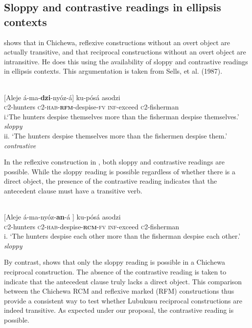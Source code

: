 \documentclass[output=paper]{langsci/langscibook}
\begin{document}
\subsection{Sloppy and contrastive readings in ellipsis contexts}

  \citet[106]{Mchombo2004} shows that in Chichewa, reflexive constructions without an overt object are actually transitive, and that reciprocal constructions without an overt object are intransitive. He does this using the availability of sloppy and contrastive readings in ellipsis contexts. This argumentation is taken from Sells, et al. (1987).



\ea\label{ex:}
\\
{}[Aleje    á-ma-\textbf{{dzi}}{-nyóz-á}] ku-pósá   asodzi \\
  \textsc{c}2-hunters   \textsc{c2-hab-}\textbf{\textsc{rfm}}-despise-\textsc{fv}   \textsc{inf}-exceed   \textsc{c}2-fisherman\\
\glt i.‘The hunters despise themselves more than the fisherman despise themselves.’ \textit{sloppy} \\
\glt ii. ‘The hunters despise themselves more than the fishermen despise them.’    \textit{contrastive}
\z


In the reflexive construction in , both sloppy and contrastive readings are possible. While the sloppy reading is possible regardless of whether there is a direct object, the presence of the contrastive reading indicates that the antecedent clause must have a transitive verb. 


\ea\label{ex:}
  \\
\gll {}[Aleje     á-ma-nyóz-\textbf{an}-á   ]    ku-pósá   asodzi \\
\textsc{c}2-hunters   \textsc{c2-hab}-despise-\textbf{\textsc{rcm}}\textsc{-fv}     \textsc{inf}-exceed   \textsc{c}2-fisherman \\
\glt
i. ‘The hunters despise each other more than the fisherman despise each other.'  \textit{sloppy}  
\z


By contrast,  shows that only the sloppy reading is possible in a Chichewa reciprocal construction. The absence of the contrastive reading is taken to indicate that the antecedent clause truly lacks a direct object. This comparison between the Chichewa RCM and reflexive marked (RFM) constructions thus provide a consistent way to test whether Lubukusu reciprocal constructions are indeed transitive. As expected under our proposal, the contrastive reading is possible.
\end{document}
